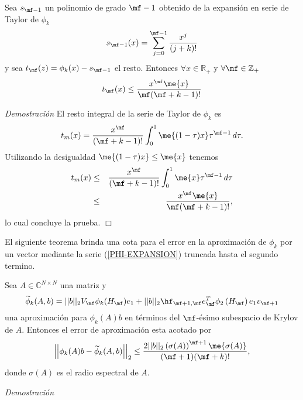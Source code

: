 \begin{lemma}
    \label{PHI-REST}
    Sea $s_{\mf-1}$ un polinomio de grado $\mf-1$ obtenido de la expansi\'on en serie de Taylor
    de $\phi_k$
    \[ s_{\mf-1}(x)= \sum_{j=0}^{\mf-1}\frac{x^{j}}{(j+k)!}\]
    y sea $t_\mf(z)=\phi_k(x)-s_{\mf-1}$ el resto. Entonces $\forall x\in\mathbb{R}_+$
    y $\forall \mf\in\mathbb{Z}_+$
    \[ t_\mf(x)\leq \frac{x^\mf\me{x}}{\mf(\mf+k-1)!} \]
\end{lemma}
\emph{Demostraci\'on} El resto integral de la serie de Taylor de $\phi_k$ es
\begin{equation*}
t_m(x)= \frac{x^\mf}{(\mf+k-1)!}\int_{0}^{1} \me{(1-\tau)x}\tau^{\mf-1} \,d\tau.
\label{PHI-INTEG-REST}
\end{equation*}
Utilizando la desigualdad $\me{(1-\tau)x}\leq\me{x}$ tenemos
\begin{eqnarray*}
    t_m(x) & \leq & \frac{x^\mf}{(\mf+k-1)!}\int_{0}^{1} \me{x}\tau^{\mf-1} \,d\tau\\
    & \leq & \frac{x^\mf\me{x}}{\mf(\mf+k-1)!},
\end{eqnarray*}
lo cual concluye la prueba. $\Box$
\newline

El siguiente teorema brinda una cota para el error en la aproximaci\'on de $\phi_k$ por un vector mediante la serie (\ref{PHI-EXPANSION}) truncada hasta el segundo termino.
\begin{theorem}\label{CORRECTED-ERROR}
    Sea $A\in\mathbb{C}^{N\times N}$ una matriz y \[{\widetilde{\phi}_k(A,b) = ||b||_2 V_\mf \phi_k(H_\mf)e_1}+||b||_2 \hf_{\mf+1,\mf}e_\mf^T\phi_2\left(H_\mf\right) e_1 v_{\mf+1} \] una aproximación para $\phi_k(A)b$ en términos del $\mf$-\'esimo subespacio de Krylov de $A$. 
     Entonces el error de aproximaci\'on esta acotado por  
    \begin{gather*}
     \left\lvert\left\lvert \phi_k(A)b - \widetilde{\phi}_k(A,b) \right\rvert\right\rvert_2%
     \leq \frac{2\vert\lvert b \rvert\rvert_2 \left( \sigma(A) \right)^{\mf+1}\me{\sigma(A)}}{(\mf+1)(\mf+k)!},
    \end{gather*}
    donde $\sigma(A)$ es el radio espectral de $A$.
\end{theorem}
\emph{Demostraci\'on}

